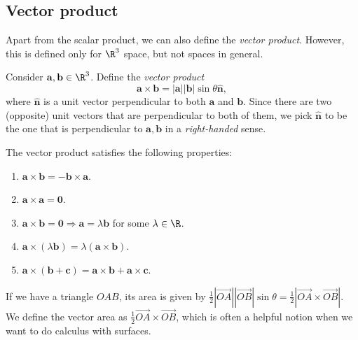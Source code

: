 \documentclass[a4paper]{article}
\begin{document}
\subsection{Vector product}
Apart from the scalar product, we can also define the \emph{vector product}. However, this is defined only for $\R^3$ space, but not spaces in general.
\begin{defi}
  Consider $\mathbf{a, b}\in \R^3$. Define the \emph{vector product}
  \[
    \mathbf{a\times b} = \mathbf{|a||b|}\sin\theta \hat{\mathbf{n}},
  \]
  where $\mathbf{\hat{n}}$ is a unit vector perpendicular to both $\mathbf{a}$ and $\mathbf{b}$. Since there are two (opposite) unit vectors that are perpendicular to both of them, we pick $\mathbf{\hat{n}}$ to be the one that is perpendicular to $\mathbf{a}, \mathbf{b}$ in a \emph{right-handed} sense.
  \begin{center}
  \end{center}
  The vector product satisfies the following properties:
  \begin{enumerate}
    \item $\mathbf{a\times b = -b\times a}$.
    \item $\mathbf{a\times a = 0}$.
    \item $\mathbf{a\times b = 0}\Rightarrow \mathbf{a} = \lambda\mathbf{b}$ for some $\lambda\in \R$.
    \item $\mathbf{a}\times (\lambda \mathbf{b}) = \lambda(\mathbf{a\times b})$.
    \item $\mathbf{a\times (b + c) = a\times b + a\times c}$.
  \end{enumerate}
\end{defi}

If we have a triangle $OAB$, its area is given by $\frac{1}{2}|\overrightarrow{OA}||\overrightarrow{OB}|\sin\theta = \frac{1}{2}|\overrightarrow{OA}\times\overrightarrow{OB}|$. We define the vector area as $\frac{1}{2}\overrightarrow{OA}\times\overrightarrow{OB}$, which is often a helpful notion when we want to do calculus with surfaces.
\end{document}
